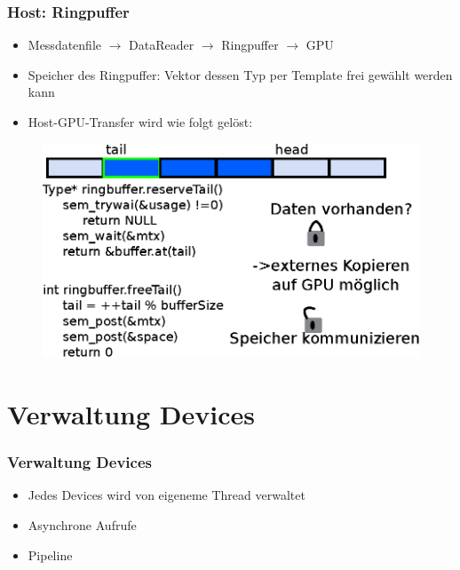 \documentclass[ddcfooter]{tudbeamer}
\begin{document}
\begin{frame}
    \frametitle*{Host: Ringpuffer}
    \begin{itemize}
        \item Messdatenfile $\rightarrow$ DataReader $\rightarrow$ Ringpuffer $\rightarrow$ GPU
        \item Speicher des Ringpuffer: Vektor dessen Typ per Template frei gewählt werden kann
        \item Host-GPU-Transfer wird wie folgt gelöst:
    \end{itemize}
    \begin{figure}
        \centering
        \includegraphics[scale=.5]{Ringbuffer.eps}
    \end{figure}
\end{frame}
\section{Verwaltung Devices}
\begin{frame}
    \frametitle*{Verwaltung Devices}
    \begin{itemize}
    	\item{Jedes Devices wird von eigeneme Thread verwaltet}
    	\item{Asynchrone Aufrufe}
    		\itemize
    			\item{Pipeline}
    		\enditemize
    \end{itemize}
\end{frame}
\end{document}
